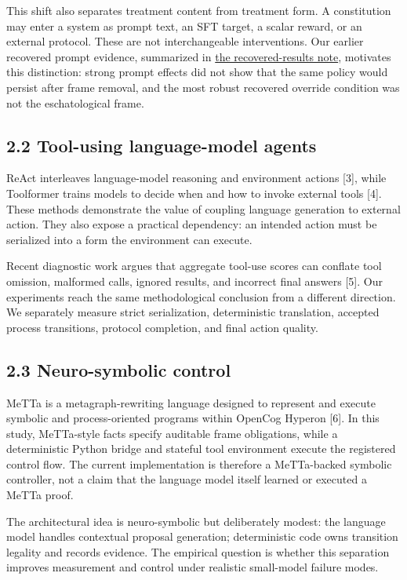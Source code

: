 \documentclass[
  11pt,
  letterpaper,
]{article}
\begin{document}
This shift also separates treatment content from treatment form. A
constitution may enter a system as prompt text, an SFT target, a scalar
reward, or an external protocol. These are not interchangeable
interventions. Our earlier recovered prompt evidence, summarized in
\href{jinn_or_beast_recovered_results_v1.md}{the recovered-results
note}, motivates this distinction: strong prompt effects did not show
that the same policy would persist after frame removal, and the most
robust recovered override condition was not the eschatological frame.

\subsection{2.2 Tool-using language-model
agents}\label{tool-using-language-model-agents}

ReAct interleaves language-model reasoning and environment actions
{[}3{]}, while Toolformer trains models to decide when and how to invoke
external tools {[}4{]}. These methods demonstrate the value of coupling
language generation to external action. They also expose a practical
dependency: an intended action must be serialized into a form the
environment can execute.

Recent diagnostic work argues that aggregate tool-use scores can
conflate tool omission, malformed calls, ignored results, and incorrect
final answers {[}5{]}. Our experiments reach the same methodological
conclusion from a different direction. We separately measure strict
serialization, deterministic translation, accepted process transitions,
protocol completion, and final action quality.

\subsection{2.3 Neuro-symbolic control}\label{neuro-symbolic-control}

MeTTa is a metagraph-rewriting language designed to represent and
execute symbolic and process-oriented programs within OpenCog Hyperon
{[}6{]}. In this study, MeTTa-style facts specify auditable frame
obligations, while a deterministic Python bridge and stateful tool
environment execute the registered control flow. The current
implementation is therefore a MeTTa-backed symbolic controller, not a
claim that the language model itself learned or executed a MeTTa proof.

The architectural idea is neuro-symbolic but deliberately modest: the
language model handles contextual proposal generation; deterministic
code owns transition legality and records evidence. The empirical
question is whether this separation improves measurement and control
under realistic small-model failure modes.
\end{document}

